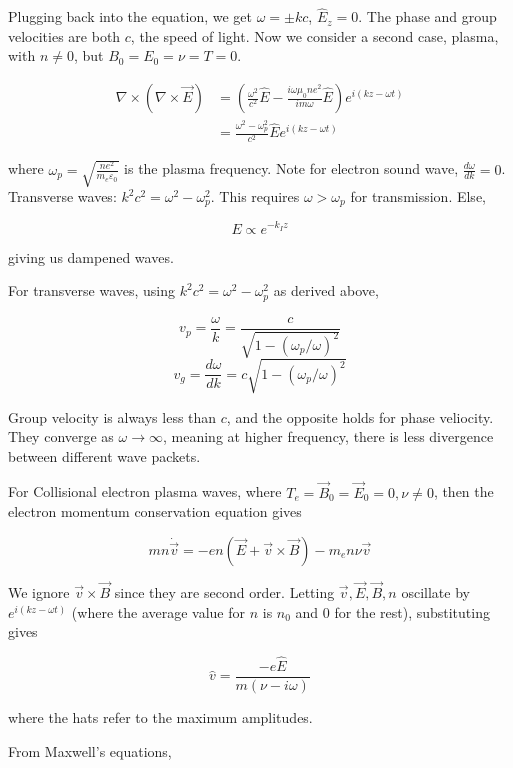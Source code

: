 \documentclass[12pt]{article}
\begin{document}
Plugging back into the equation, we get $\omega = \pm kc$, $\hat E_z = 0$. The phase and group velocities are both $c$, the speed of light. Now we consider a second case, plasma, with $n \neq 0$, but $B_0 = E_0 = \nu = T = 0$.

\begin{align*}
    \nabla \times (\nabla \times \vec E) &= \left(\frac{\omega^2}{c^2} \hat E - \frac{i\omega\mu_0ne^2}{im\omega}\hat E\right) e^{i(kz-\omega t)} \\
                                         &= \frac{\omega^2-\omega_p^2}{c^2} \hat E e^{i(kz-\omega t)}
\end{align*}

where $\omega_p = \sqrt{\frac{ne^2}{m_e\varepsilon_0}}$ is the plasma frequency. Note for electron sound wave, $\frac{d\omega}{dk} = 0$. \\

Transverse waves: $k^2c^2 = \omega^2 - \omega_p^2$. This requires $\omega > \omega_p$ for transmission. Else,

$$E \propto e^{-k_Iz}$$

giving us dampened waves.

For transverse waves, using $k^2c^2 = \omega^2 - \omega_p^2$ as derived above,

$$v_p = \frac{\omega}{k} = \frac{c}{\sqrt{1 - (\omega_p/\omega)^2}}$$
$$v_g = \frac{d\omega}{dk} = c\sqrt{1-(\omega_p/\omega)^2}$$

Group velocity is always less than $c$, and the opposite holds for phase veliocity. They converge as $\omega \rightarrow \infty$, meaning at higher frequency, there is less divergence between different wave packets.

For Collisional electron plasma waves, where $T_e = \vec B_0 = \vec E_0 = 0, \nu \neq 0$, then the electron momentum conservation equation gives

$$mn\dot{\vec v} = -en(\vec E + \vec v \times \vec B) - m_en\nu\vec v$$

We ignore $\vec v \times \vec B$ since they are second order. Letting $\vec v, \vec E, \vec B, n$ oscillate by $e^{i(kz-\omega t)}$ (where the average value for $n$ is $n_0$ and 0 for the rest), substituting gives

$$\hat v = \frac{-e\hat E}{m(\nu-i\omega)}$$

where the hats refer to the maximum amplitudes.

From Maxwell's equations,
\end{document}
